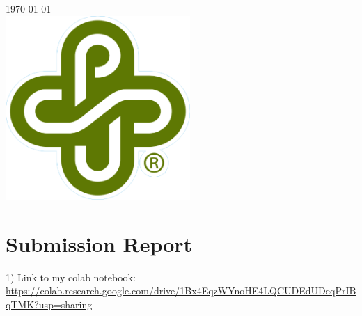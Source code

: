 \documentclass[12pt]{article}
\begin{document}
\begin{titlepage}
		
		
		{\large \today}\\[0.7cm] %
		
		
		\includegraphics[width=7cm]{PSU_LOGO.png}\\[.5cm] %
		
		
		\vfill %
		
	\end{titlepage}
	
	
	
	\section*{Submission Report}
	
	
		1) Link to my colab notebook:\\
		 \url{https://colab.research.google.com/drive/1Bx4EqzWYnoHE4LQCUDEdUDcqPrIBqTMK?usp=sharing}
		
\end{document}
